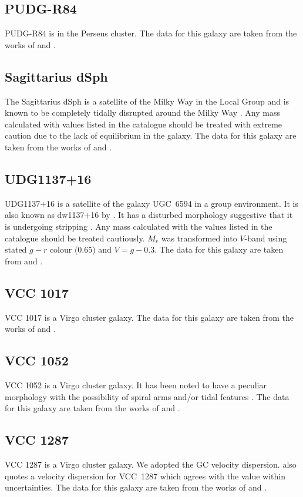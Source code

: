 \subsection{PUDG-R84}
PUDG-R84 is in the Perseus cluster. The data for this galaxy are taken from the works of \citet{Gannon2022} and \citet{FerreMateu2023}. 

\subsection{Sagittarius dSph}
The Sagittarius dSph is a satellite of the Milky Way in the Local Group and is known to be completely tidally disrupted around the Milky Way \citep{Ibata2001}. Any mass calculated with values listed in the catalogue should be treated with extreme caution due to the lack of equilibrium in the galaxy. The data for this galaxy are taken from the works of \citet{mcconnachie2012, Karachentsev2017} and \citet{Forbes2018}.

\subsection{UDG1137+16}
UDG1137+16 is a satellite of the galaxy UGC~6594 in a group environment. It is also known as dw1137+16 by \citet{Muller2018}. It has a disturbed morphology suggestive that it is undergoing stripping \citep{Gannon2021}. Any mass calculated with the values listed in the catalogue should be treated cautiously. $M_r$ was transformed into $V$-band using stated $g-r$ colour (0.65) and $V=g-0.3$. The data for this galaxy are taken from \citet{Gannon2021} and \citet{FerreMateu2023}.

\subsection{VCC 1017}
VCC 1017 is a Virgo cluster galaxy. The data for this galaxy are taken from the works of \citet{Lim2020} and \citet{Toloba2023}.

\subsection{VCC 1052}
VCC 1052 is a Virgo cluster galaxy. It has been noted to have a peculiar morphology with the possibility of spiral arms and/or tidal features \citep{Lim2020}. The data for this galaxy are taken from the works of \citet{Lim2020} and \citet{Toloba2023}.

\subsection{VCC 1287}
VCC 1287 is a Virgo cluster galaxy. We adopted the \citet{Beasley2016} GC velocity dispersion. \citet{Toloba2023} also quotes a velocity dispersion for VCC~1287 which agrees with the \citet{Beasley2016} value within uncertainties. The data for this galaxy are taken from the works of \citet{Beasley2016, Gannon2020, Gannon2021} and \citet{Lim2020}.

